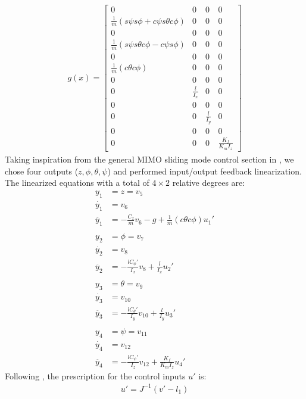 \documentclass[conference]{IEEEtran}
\newcommand{\cphi}{c\phi}
\newcommand{\cth}{c\theta}
\newcommand{\cpsi}{c\psi}
\newcommand{\sphi}{s\phi}
\newcommand{\sth}{s\theta}
\newcommand{\spsi}{s\psi}
\begin{document}
\begin{align*}
g(x) = \begin{bmatrix}
0 & 0 & 0 & 0 \\
\frac{1}{m}(\spsi\sphi + \cpsi\sth\cphi) & 0 & 0 & 0 \\
0 & 0 & 0 & 0 \\
\frac{1}{m}(\spsi\sth\cphi - \cpsi\sphi)  & 0 & 0 & 0 \\
0 & 0 & 0 & 0 \\
\frac{1}{m} (\cth\cphi)  & 0 & 0 & 0 \\
0 & 0 & 0 & 0 \\
0 & \frac{l}{I_x} & 0 & 0 \\
0 & 0 & 0 & 0 \\
0 & 0 &  \frac{l}{I_y} & 0\\
0 & 0 & 0 & 0 \\
0 & 0 & 0 & \frac{K_f}{K_mI_z}
\end{bmatrix}
\end{align*}
Taking inspiration from the general MIMO sliding mode control section in \cite{bib:hedrick}, we chose four outputs ($z,\phi,\theta,\psi$) and performed input/output feedback linearization. The linearized equations with a total of $4 \times 2$ relative degrees are:
\begin{align*}
y_1 &= z = v_5 \\
\dot{y_1} &= v_6 \\
\ddot{y_1} &= -\frac{C_z}{m}v_6 - g + \frac{1}{m}(\cth\cphi) u_1' \\
\\
y_2 &= \phi = v_7 \\
\dot{y_2} &= v_8 \\
\ddot{y_2} &= -\frac{lC_\phi'}{I_x}v_8 + \frac{l}{I_x} u_2' \\
\\
y_3 &= \theta = v_{9} \\
\dot{y_3} &= v_{10} \\
\ddot{y_3} &= -\frac{lC_\theta'}{I_y}v_{10} + \frac{l}{I_y} u_3' \\
\\
y_4 &= \psi = v_{11} \\
\dot{y_4} &= v_{12} \\
\ddot{y_4} &= -\frac{lC_\psi'}{I_z}v_{12} + \frac{K_f}{K_mI_z} u_4' 
\end{align*}
Following \cite{bib:hedrick}, the prescription for the control inputs $u'$ is:
\begin{align*}
u' = J^{-1}(v'-l_1)
\end{align*}
\end{document}
